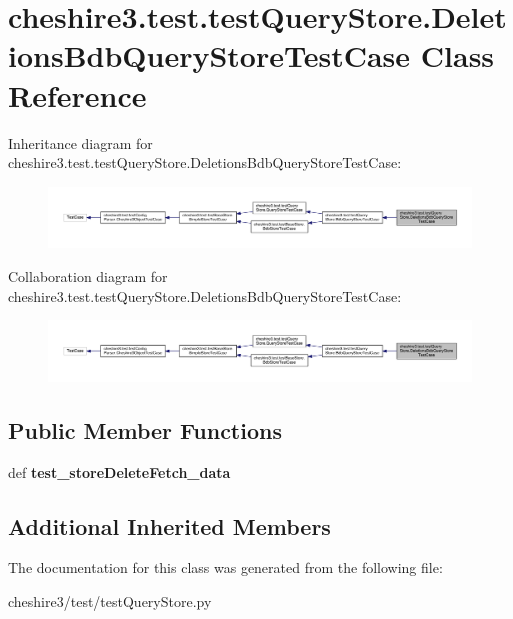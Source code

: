 \hypertarget{classcheshire3_1_1test_1_1test_query_store_1_1_deletions_bdb_query_store_test_case}{\section{cheshire3.\-test.\-test\-Query\-Store.\-Deletions\-Bdb\-Query\-Store\-Test\-Case Class Reference}
\label{classcheshire3_1_1test_1_1test_query_store_1_1_deletions_bdb_query_store_test_case}
}


Inheritance diagram for cheshire3.\-test.\-test\-Query\-Store.\-Deletions\-Bdb\-Query\-Store\-Test\-Case\-:
\nopagebreak
\begin{figure}[H]
\begin{center}
\leavevmode
\includegraphics[width=350pt]{classcheshire3_1_1test_1_1test_query_store_1_1_deletions_bdb_query_store_test_case__inherit__graph}
\end{center}
\end{figure}


Collaboration diagram for cheshire3.\-test.\-test\-Query\-Store.\-Deletions\-Bdb\-Query\-Store\-Test\-Case\-:
\nopagebreak
\begin{figure}[H]
\begin{center}
\leavevmode
\includegraphics[width=350pt]{classcheshire3_1_1test_1_1test_query_store_1_1_deletions_bdb_query_store_test_case__coll__graph}
\end{center}
\end{figure}
\subsection*{Public Member Functions}
\begin{DoxyCompactItemize}
\item 
\hypertarget{classcheshire3_1_1test_1_1test_query_store_1_1_deletions_bdb_query_store_test_case_aaa04fc8de04707806eee2e6dbf9bab49}{def {\bfseries test\-\_\-store\-Delete\-Fetch\-\_\-data}}\label{classcheshire3_1_1test_1_1test_query_store_1_1_deletions_bdb_query_store_test_case_aaa04fc8de04707806eee2e6dbf9bab49}

\end{DoxyCompactItemize}
\subsection*{Additional Inherited Members}


The documentation for this class was generated from the following file\-:\begin{DoxyCompactItemize}
\item 
cheshire3/test/test\-Query\-Store.\-py\end{DoxyCompactItemize}
